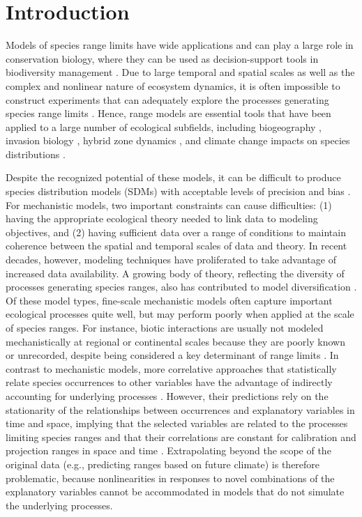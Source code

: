 \documentclass[11pt]{article}
\begin{document}
%
%

\section*{Introduction}

Models of species range limits have wide applications and can play a large role in conservation biology, where they can be used as decision-support tools in biodiversity management \citep{Guisan2013}.
Due to large temporal and spatial scales as well as the complex and nonlinear nature of ecosystem dynamics, it is often impossible to construct experiments that can adequately explore the processes generating species range limits \citep{Wu1995, Levin1998}. 
Hence, range models are essential tools that have been applied to a large number of ecological subfields, including biogeography \citep{Schurr2012}, invasion biology \citep{Catterall2012, Gallien2012}, hybrid zone dynamics \citep{Engler2013}, and climate change impacts on species distributions \citep{Blois2013, Thuiller2014}. 

Despite the recognized potential of these models, it can be difficult to produce species distribution models (SDMs) with acceptable levels of precision and bias \citep{Guisan2013}.
For mechanistic models, two important constraints can cause difficulties: (1) having the appropriate ecological theory needed to link data to modeling objectives, and (2) having sufficient data over a range of conditions to maintain coherence between the spatial and temporal scales of data and theory.
In recent decades, however, modeling techniques have proliferated to take advantage of increased data availability. 
A growing body of theory, reflecting the diversity of processes generating species ranges, also has contributed to model diversification \citep{Boulangeat2012}.
Of these model types, fine-scale mechanistic models often capture important ecological processes quite well, but may perform poorly when applied at the scale of species ranges.
For instance, biotic interactions are usually not modeled mechanistically at regional or continental scales because they are poorly known or unrecorded, despite being considered a key determinant of range limits \citep{Pigot2013}. 
In contrast to mechanistic models, more correlative approaches that statistically relate species occurrences to other variables have the advantage of indirectly accounting for underlying processes \citep{Guisan2000}.
However, their predictions rely on the stationarity of the relationships between occurrences and explanatory variables in time and space, implying that the selected variables are related to the processes limiting species ranges and that their correlations are constant for calibration and projection ranges in space and time \citep{Dormann2007}. 
Extrapolating beyond the scope of the original data (e.g., predicting ranges based on future climate) is therefore problematic, because nonlinearities in responses to novel combinations of the explanatory variables cannot be accommodated in models that do not simulate the underlying processes.
\end{document}
